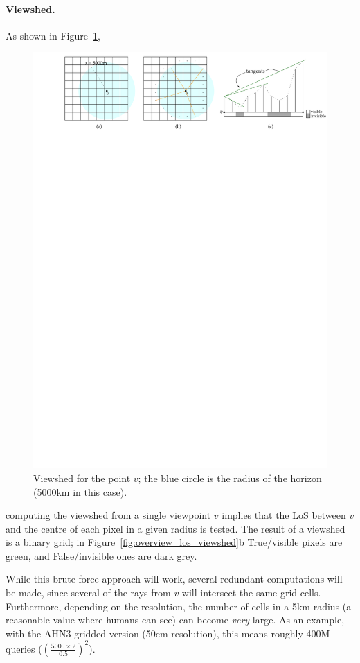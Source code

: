 \paragraph{Viewshed.}
As shown in Figure~\ref{fig:viewshed},
\begin{figure}
  \centering
  \includegraphics[width=\linewidth]{figs/viewshed}
  \caption{Viewshed for the point $v$; the blue circle is the radius of the horizon (5000km in this case).}
\label{fig:viewshed}
\end{figure}
computing the viewshed from a single viewpoint $v$ implies that the LoS between $v$ and the centre of each pixel in a given radius is tested. 
The result of a viewshed is a binary grid; in Figure~\ref{fig:overview_los_viewshed}b True/visible pixels are green, and False/invisible ones are dark grey.

%

While this brute-force approach will work, several redundant computations will be made, since several of the rays from $v$ will intersect the same grid cells.
Furthermore, depending on the resolution, the number of cells in a 5km radius (a reasonable value where humans can see) can become \emph{very} large.
As an example, with the AHN3 gridded version (50cm resolution), this means roughly 400M queries ($(\frac{5000 \times 2}{0.5})^2$).


